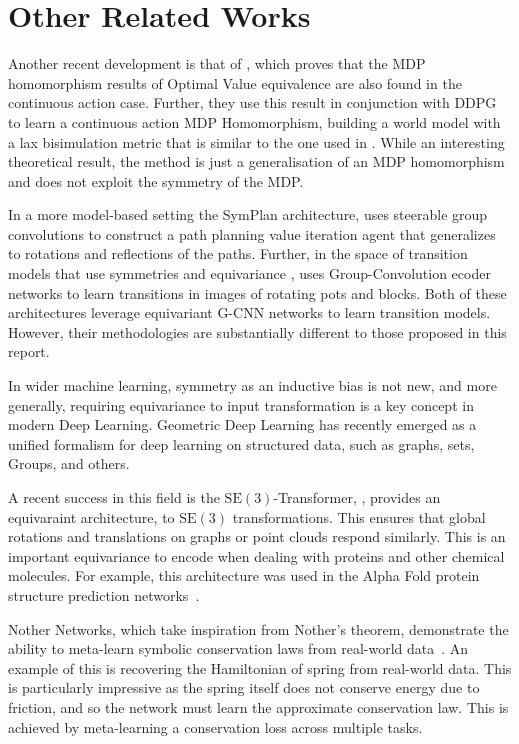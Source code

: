 \section{Other Related Works}

Another recent development is that of \cite{rezaei2022continuous}, which proves that the MDP homomorphism results of Optimal Value equivalence are also found in the continuous action case. Further, they use this result in conjunction with DDPG\cite{lillicrap2015continuous} to learn a continuous action MDP Homomorphism, building a world model with a lax bisimulation metric that is similar to the one used in \cite{van2020plannable}. While an interesting theoretical result, the method is just a generalisation of an MDP homomorphism and does not exploit the symmetry of the MDP.

In a more model-based setting the SymPlan architecture, \cite{zhao2022integrating}  uses steerable group convolutions to construct a path planning value iteration agent that generalizes to rotations and reflections of the paths. Further, in the space of transition models that use symmetries and equivariance \cite{park2022learning}, uses Group-Convolution ecoder networks to learn transitions in images of rotating pots and blocks. Both of these architectures leverage equivariant G-CNN networks to learn transition models. However, their methodologies are substantially different to those proposed in this report.

In wider machine learning, symmetry as an inductive bias is not new, and more generally, requiring equivariance to input transformation is a key concept in modern Deep Learning. Geometric Deep Learning has recently emerged as a unified formalism for deep learning on structured data, such as graphs, sets, Groups, and others.


A recent success in this field is the $\text{SE}(3)$-Transformer, \cite{fuchs2020se}, provides an equivaraint architecture, to $\text{SE}(3)$ transformations. This ensures that global rotations and translations on graphs or point clouds respond similarly. This is an important equivariance to encode when dealing with proteins and other chemical molecules. For example, this architecture was used in the Alpha Fold protein structure prediction networks~\cite{jumper2021highly}.

Nother Networks, which take inspiration from Nother's theorem, demonstrate the ability to meta-learn symbolic conservation laws from real-world data~\cite{alet2021noether}. An example of this is recovering the Hamiltonian of spring from real-world data. This is particularly impressive as the spring itself does not conserve energy due to friction, and so the network must learn the approximate conservation law. This is achieved by meta-learning a conservation loss across multiple tasks.



